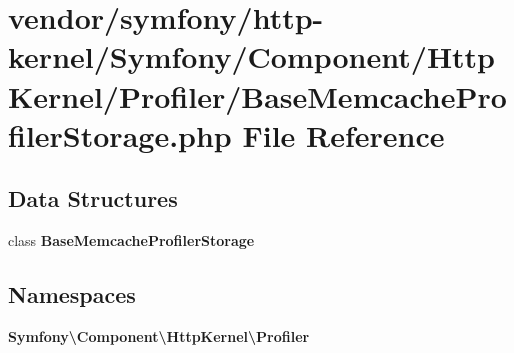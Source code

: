\section{vendor/symfony/http-\/kernel/\+Symfony/\+Component/\+Http\+Kernel/\+Profiler/\+Base\+Memcache\+Profiler\+Storage.php File Reference}
\label{_base_memcache_profiler_storage_8php}
\subsection*{Data Structures}
\begin{DoxyCompactItemize}
\item 
class {\bf Base\+Memcache\+Profiler\+Storage}
\end{DoxyCompactItemize}
\subsection*{Namespaces}
\begin{DoxyCompactItemize}
\item 
 {\bf Symfony\textbackslash{}\+Component\textbackslash{}\+Http\+Kernel\textbackslash{}\+Profiler}
\end{DoxyCompactItemize}
